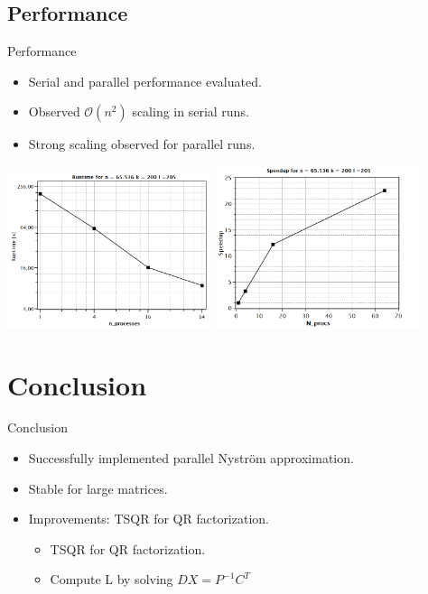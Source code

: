 \documentclass[aspectratio=169, xcolor=table]{beamer}
\begin{document}
\subsection{Performance}
\begin{frame}{Performance}
  \begin{itemize}
    \item Serial and parallel performance evaluated.
    \item Observed $\mathcal{O}(n^2)$ scaling in serial runs.
    \item Strong scaling observed for parallel runs.
  \end{itemize}
  \begin{center}    
    \includegraphics[width=0.45\textwidth]{../results/plots/parallel_runtime.png}
    \includegraphics[width=0.45\textwidth]{../results/plots/parallel_speedup.png}
  \end{center}
\end{frame}

\section{Conclusion}
\begin{frame}{Conclusion}
  \begin{itemize}
    \item Successfully implemented parallel Nystr\"om approximation.
    \item Stable for large matrices.
    \item Improvements: TSQR for QR factorization.
    \begin{itemize}
      \item TSQR for QR factorization.
      \item Compute L by solving $DX =P^{-1}C^T$
    \end{itemize}
  \end{itemize}
\end{frame}
\end{document}
